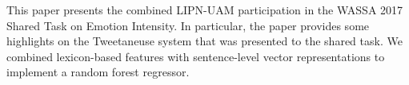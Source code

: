 This paper presents the combined LIPN-UAM participation in the WASSA 2017 Shared Task on Emotion Intensity. In particular, the paper provides some highlights on the Tweetaneuse system that was presented to the shared task. We combined lexicon-based features with sentence-level vector representations to implement a random forest regressor.
